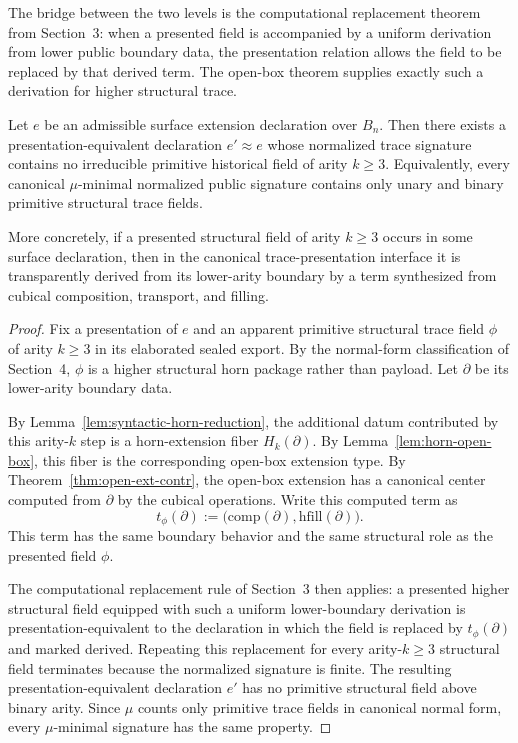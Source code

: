 The bridge between the two levels is the computational replacement theorem from
Section~3: when a presented field is accompanied by a uniform derivation from lower public
boundary data, the presentation relation allows the field to be replaced by that derived term.
The open-box theorem supplies exactly such a derivation for higher structural trace.

\begin{theorem}
\label{thm:minimal-signature-elimination}
Let \(e\) be an admissible surface extension declaration over \(B_n\).  Then there exists a
presentation-equivalent declaration \(e'\approx e\) whose normalized trace signature contains
no irreducible primitive historical field of arity \(k\geq 3\).  Equivalently, every canonical
\(\mu\)-minimal normalized public signature contains only unary and binary primitive
structural trace fields.

More concretely, if a presented structural field of arity \(k\geq 3\) occurs in some surface
declaration, then in the canonical trace-presentation interface it is transparently derived
from its lower-arity boundary by a term synthesized from cubical composition, transport, and
filling.
\end{theorem}

\begin{proof}
Fix a presentation of \(e\) and an apparent primitive structural trace field \(\phi\) of arity
\(k\geq 3\) in its elaborated sealed export.  By the normal-form classification of Section~4,
\(\phi\) is a higher structural horn package rather than payload.  Let \(\partial\) be its
lower-arity boundary data.

By Lemma~\ref{lem:syntactic-horn-reduction}, the additional datum contributed by this
arity-\(k\) step is a horn-extension fiber \(H_k(\partial)\).  By
Lemma~\ref{lem:horn-open-box}, this fiber is the corresponding open-box extension type.
By Theorem~\ref{thm:open-ext-contr}, the open-box extension has a canonical center computed
from \(\partial\) by the cubical operations.  Write this computed term as
\[
  t_{\phi}(\partial)
  :=
  \bigl(\mathrm{comp}(\partial),\mathrm{hfill}(\partial)\bigr).
\]
This term has the same boundary behavior and the same structural role as the presented
field \(\phi\).

The computational replacement rule of Section~3 then applies: a presented higher structural
field equipped with such a uniform lower-boundary derivation is presentation-equivalent to
the declaration in which the field is replaced by \(t_{\phi}(\partial)\) and marked derived.
Repeating this replacement for every arity-\(k\geq 3\) structural field terminates because the
normalized signature is finite.  The resulting presentation-equivalent declaration \(e'\) has
no primitive structural field above binary arity.  Since \(\mu\) counts only primitive trace
fields in canonical normal form, every \(\mu\)-minimal signature has the same property.
\end{proof}

